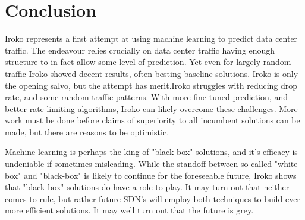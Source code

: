 \section{Conclusion}
\label{sec:conclusion}

Iroko represents a first attempt at using machine learning
to predict data center traffic. The endeavour relies crucially
on data center traffic having enough structure to in fact allow
some level of prediction. Yet even for largely random traffic
Iroko showed decent results, often besting baseline solutions.
Iroko is only the opening salvo, but the attempt has merit.Iroko
struggles with reducing drop rate, and some random traffic
patterns. With more fine-tuned
prediction, and better rate-limiting algorithms, Iroko can likely
overcome these challenges. 
More work must be done before claims of superiority to all
incumbent solutions can be made, but there are reasons to be
optimistic. 

Machine learning is perhaps the king of "black-box" solutions, 
and it's efficacy is undeniable if sometimes misleading. While
the standoff between so called "white-box" and "black-box" is 
likely to continue for the foreseeable future, Iroko shows
that "black-box" solutions do have a role to play. It may turn
out that neither comes to rule, but rather future SDN's will 
employ both techniques to build ever more efficient solutions.
It may well turn out that the future is grey.



